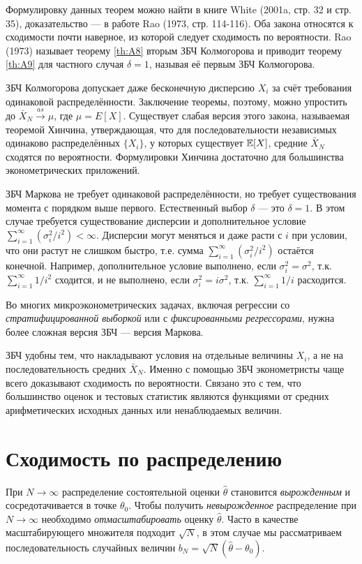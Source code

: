 Формулировку данных теорем можно найти в книге White (2001a, стр. 32 и стр. 35), доказательство --- в работе Rao (1973, стр. 114-116). Оба закона относятся к сходимости почти наверное, из которой следует сходимость по вероятности. Rao (1973) называет теорему \ref{th:A8} вторым ЗБЧ Колмогорова и приводит теорему \ref{th:A9} для частного случая $\delta=1$, называя её первым ЗБЧ Колмогорова.

ЗБЧ Колмогорова допускает даже бесконечную дисперсию $X_i$ за счёт требования одинаковой распределённости. Заключение теоремы, поэтому, можно упростить до $\bar{X}_N \overset{as}{\to} \mu$, где $\mu=E[X]$. Существует слабая версия этого закона, называемая теоремой Хинчина, утверждающая, что для последовательности независимых одинаково распределённых $\{X_i\}$, у которых существует $\mathbb{E}[X]$, средние $\bar{X}_N$ сходятся по вероятности. Формулировки Хинчина достаточно для большинства эконометрических приложений.

ЗБЧ Маркова не требует одинаковой распределённости, но требует существования момента с порядком выше первого. Естественный выбор $\delta$ --- это $\delta=1$. В этом случае требуется существование дисперсии и дополнительное условие $\sum_{i=1}^{\infty} (\sigma^2_i/i^2) < \infty$. Дисперсии могут меняться и даже расти с $i$ при условии, что они растут не слишком быстро, т.е. сумма $\sum_{i=1}^{\infty} (\sigma^2_i/i^2)$ остаётся конечной. Например, дополнительное условие выполнено, если $\sigma^2_i=\sigma^2$, т.к. $\sum_{i=1}^{\infty} 1/i^2$ сходится, и не выполнено, если $\sigma^2_i=i\sigma^2$, т.к. $\sum_{i=1}^{\infty} 1/i$ расходится.

Во многих микроэконометрических задачах, включая регрессии со \textit{стратифицированной выборкой} или с \textit{фиксированными регрессорами}, нужна более сложная версия ЗБЧ --- версия Маркова.

ЗБЧ удобны тем, что накладывают условия на отдельные величины $X_i$, а не на последовательность средних $\bar{X}_N$. Именно с помощью ЗБЧ эконометристы чаще всего доказывают сходимость по вероятности. Связано это с тем, что большинство оценок и тестовых статистик являются функциями от средних арифметических исходных данных или ненаблюдаемых величин.

\section{Сходимость по распределению}

При $N\to\infty$ распределение состоятельной оценки $\hat{\theta}$ становится \textit{вырожденным} и сосредотачивается в точке $\theta_0$. Чтобы получить \textit{невырожденное} распределение при $N\to\infty$ необходимо \textit{отмасштабировать} оценку $\hat{\theta}$. Часто в качестве масштабирующего множителя подходит $\sqrt{N}$, в этом случае мы рассматриваем последовательность случайных величин $b_N=\sqrt{N}(\hat{\theta}-\theta_0)$.

